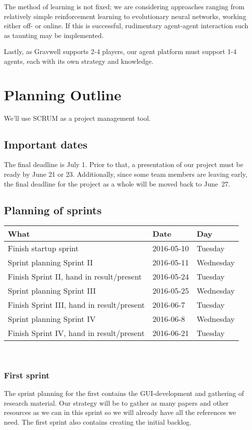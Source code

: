 \documentclass[a4paper]{llncs}
\begin{document}
The method of learning is not fixed; we are considering approaches ranging
from relatively simple reinforcement learning to evolutionary neural networks,
working either off- or online. If this is successful,
rudimentary agent-agent interaction such as taunting may be implemented.

Lastly, as Gravwell supports 2-4 players, our agent platform must support
1-4 agents, each with its own strategy and knowledge.

\section*{Planning Outline}
We'll use SCRUM as a project management tool.

\subsection*{Important dates}
The final deadline is July 1. Prior to that, a presentation of our project
must be ready by June 21 or 23. Additionally, since some team members are
leaving early, the final deadline for the project as a whole will be moved
back to June~27.

\subsection*{Planning of sprints}
\begin{tabular}{l l l}
	What & Date & Day \\ \toprule
	Finish startup sprint & 2016-05-10 & Tuesday\\
	Sprint planning Sprint II & 2016-05-11 & Wednesday\\
	Finish Sprint II, hand in result/present & 2016-05-24 & Tuesday\\
	Sprint planning Sprint III & 2016-05-25 & Wednesday\\
	Finish Sprint III, hand in result/present & 2016-06-7 & Tuesday\\
	Sprint planning Sprint IV& 2016-06-8 & Wednesday\\
	Finish Sprint IV, hand in result/present & 2016-06-21 & Tuesday\\ \bottomrule
\end{tabular} \\

\subsubsection*{First sprint}
The sprint planning for the first contains the GUI-development and
gathering of research material. Our strategy will be to gather as
many papers and other resources as we can in this sprint so we will
already have all the references we need.
The first sprint also contains creating the initial backlog.
\end{document}

